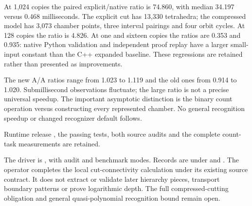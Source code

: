 At 1,024 copies the paired explicit/native ratio is 74.860, with median
34.197 versus 0.468 milliseconds. The explicit cut has 13,330 tetrahedra;
the compressed model has 3,073 chamber points, three interval pairings and
four orbit cycles. At 128 copies the ratio is 4.826. At one and sixteen
copies the ratios are 0.353 and 0.935: native Python validation and independent
proof replay have a larger small-input constant than the C++ expanded baseline.
These regressions are retained rather than presented as improvements.

The new A/A ratios range from 1.023 to 1.119 and the old ones from 0.914
to 1.020. Submillisecond observations fluctuate; the large ratio is not a
precise universal speedup. The important asymptotic distinction is the
binary count operation versus constructing every represented chamber.
No general recognition speedup or changed recognizer default follows.

Runtime release , the passing tests, both source audits and
the complete count-task measurements are retained.

The driver is , with audit
and benchmark modes. Records are under  and
. The operator completes the local
cut-connectivity calculation under its existing source contract. It does
not extract or validate later hierarchy pieces, transport boundary patterns
or prove logarithmic depth. The full compressed-cutting obligation and
general quasi-polynomial recognition bound remain open.
